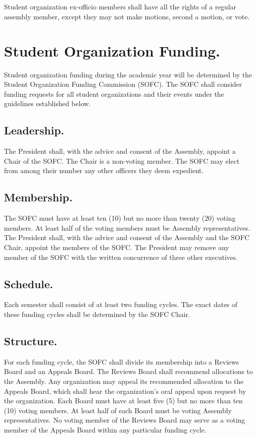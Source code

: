 \subsection{}
Student organization ex-officio members shall have all the rights of a regular assembly member, except they may not make motions, second a motion, or vote.


\section{Student Organization Funding.}
Student organization funding during the academic year will be determined by the Student Organization Funding Commission (SOFC).  The SOFC shall consider funding requests for all student organizations and their events under the guidelines established below.

\subsection{Leadership.}
The President shall, with the advice and consent of the Assembly, appoint a Chair of the SOFC.  The Chair is a non-voting member.  The SOFC may elect from among their number any other officers they deem expedient.

\subsection{Membership.}
The SOFC must have at least ten (10) but no more than twenty (20) voting members.  At least half of the voting members must be Assembly representatives.  The President shall, with the advice and consent of the Assembly and the SOFC Chair, appoint the members of the SOFC.  The President may remove any member of the SOFC with the written concurrence of three other executives.

\subsection{Schedule.}
Each semester shall consist of at least two funding cycles.  The exact dates of these funding cycles shall be determined by the SOFC Chair.

\subsection{Structure.}
For each funding cycle, the SOFC shall divide its membership into a Reviews Board and an Appeals Board.  The Reviews Board shall recommend allocations to the Assembly.  Any organization may appeal its recommended allocation to the Appeals Board, which shall hear the organization's oral appeal upon request by the organization.  Each Board must have at least five (5) but no more than ten (10) voting members.  At least half of each Board must be voting Assembly representatives.  No voting member of the Reviews Board may serve as a voting member of the Appeals Board within any particular funding cycle.

